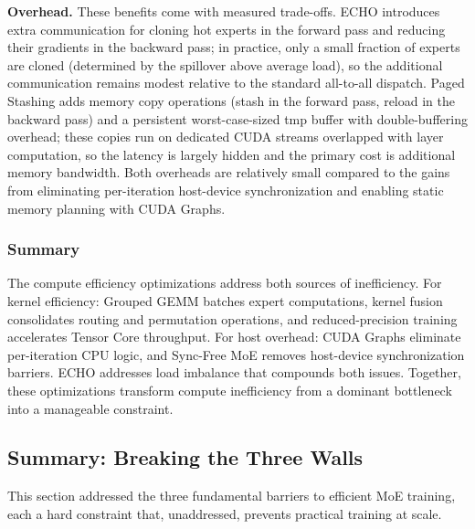 \documentclass[10pt,logo,copyright]{nvidiatechreport}
\begin{document}
\noindent\textbf{Overhead.}
These benefits come with measured trade-offs.
ECHO introduces extra communication for cloning hot experts in the forward pass and reducing their gradients in the backward pass; in practice, only a small fraction of experts are cloned (determined by the spillover above average load), so the additional communication remains modest relative to the standard all-to-all dispatch.
Paged Stashing adds memory copy operations (stash in the forward pass, reload in the backward pass) and a persistent worst-case-sized tmp buffer with double-buffering overhead; these copies run on dedicated CUDA streams overlapped with layer computation, so the latency is largely hidden and the primary cost is additional memory bandwidth.
Both overheads are relatively small compared to the gains from eliminating per-iteration host-device synchronization and enabling static memory planning with CUDA Graphs.

\subsubsection{Summary}

The compute efficiency optimizations address both sources of inefficiency. For kernel efficiency: Grouped GEMM batches expert computations, kernel fusion consolidates routing and permutation operations, and reduced-precision training accelerates Tensor Core throughput. For host overhead: CUDA Graphs eliminate per-iteration CPU logic, and Sync-Free MoE removes host-device synchronization barriers. ECHO addresses load imbalance that compounds both issues. Together, these optimizations transform compute inefficiency from a dominant bottleneck into a manageable constraint.

\subsection{Summary: Breaking the Three Walls}

This section addressed the three fundamental barriers to efficient MoE training, each a hard constraint that, unaddressed, prevents practical training at scale.
\end{document}
